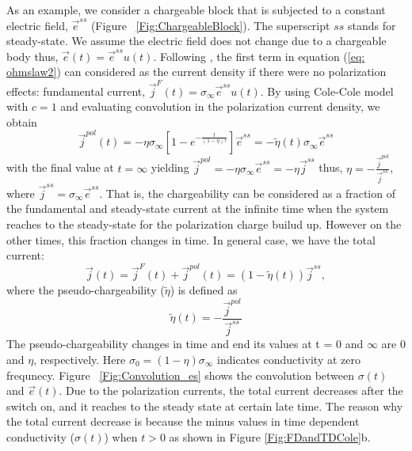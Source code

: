 \documentclass[a4paper, 11pt]{article}
\newcommand{\siginf}{\sigma_\infty}
\renewcommand {\j}  { {\vec j} }
\newcommand {\e}  { {\vec e} }
\newcommand{\peta}{\tilde{\eta}}
\begin{document}
As an example, we consider a chargeable block that is subjected to a constant electric field, $\e^{ss}$ (Figure ~\ref{Fig:ChargeableBlock}). The superscript $ss$ stands for steady-state. We assume the electric field does not change due to a chargeable body thus, $\e(t) = \e^{ss}u(t)$. Following \cite{Smith1988a}, the first term in equation (\ref{eq: ohmslaw2}) can considered as the current density if there were no polarization effects: fundamental current, $\j^{F}(t)=\siginf \e^{ss}u(t)$. By using Cole-Cole model with $c=1$  and evaluating convolution in the polarization current density, we obtain
\begin{equation}
	\j^{pol}(t) = -\eta\siginf [1-e^{-\frac{t}{(1-\eta)\tau}}]\e^{ss} = -\peta(t)\siginf\e^{ss}
	\label{eq: IPdensity}
\end{equation}
with the final value at $t = \infty$ yielding $\j^{pol}=-\eta\siginf\e^{ss}=-\eta\j^{ss}$ thus, $\eta = -\frac{\j^{pol}}{\j^{ss}}$, where $\j^{ss}=\siginf \e^{ss}$. That is, the chargeability can be considered as a fraction of the fundamental and steady-state current at the infinite time when the system reaches to the steady-state for the polarization charge builud up. However on the other times, this fraction changes in time. In general case,  we have the total current:
\begin{equation}
	\j(t) = \j^{F}(t) + \j^{pol}(t) = (1-\peta(t))\j^{ss},
  \label{eq: ohmslaw3}
\end{equation}
where the pseudo-chargeability ($\peta$) is defined as 
\begin{equation}
  \peta(t) = -\frac{\j^{pol}}{\j^{ss}} 
  \label{eq: pseudochargeability_ss}
\end{equation}
The pseudo-chargeability changes in time and end its values at t = 0 and $\infty$ are 0 and $\eta$, respectively. Here $\sigma_0=(1-\eta)\siginf$ indicates conductivity at zero frequnecy.  Figure ~\ref{Fig:Convolution_es} shows the convolution between $\sigma(t)$ and $\e(t)$. Due to the polarization currents, the total current decreases after the switch on, and it reaches to the steady state at certain late time. The reason why the total current decrease is because the minus values in time dependent conductivity ($\sigma(t)$) when $t>0$ as shown in Figure \ref{Fig:FDandTDCole}b. 
\end{document}
